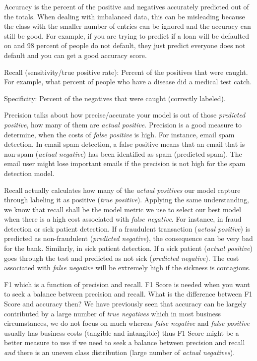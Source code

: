 Accuracy is the percent of the positive and negatives accurately predicted out of the totals.  When dealing with imbalanced data, this can be misleading because the class with the smaller number of entries can be ignored and the accuracy can still be good.  For example, if you are trying to predict if a loan will be defaulted on and 98 percent of people do not default, they just predict everyone does not default and you can get a good accuracy score.

Recall (sensitivity/true positive rate): Percent of the positives that were caught.  For example, what percent of people who have a disease did a medical test catch.

Specificity: Percent of the negatives that were caught (correctly labeled).

Precision talks about how precise/accurate your model is out of those \emph{predicted positive}, how many of them are \emph{actual positive}.
Precision is a good measure to determine, when the costs of \emph{false positive} is high. For instance, email spam detection. In email spam detection, a false positive means that an email that is non-spam (\emph{actual negative}) has been identified as spam (predicted spam). The email user might lose important emails if the precision is not high for the spam detection model.

Recall actually calculates how many of the \emph{actual positives} our model capture through labeling it as positive (\emph{true positive}). Applying the same understanding, we know that recall shall be the model metric we use to select our best model when there is a high cost associated with \emph{false negative}.  For instance, in fraud detection or sick patient detection. If a fraudulent transaction (\emph{actual positive}) is predicted as non-fraudulent (\emph{predicted negative}), the consequence can be very bad for the bank.  Similarly, in sick patient detection. If a sick patient (\emph{actual positive}) goes through the test and predicted as not sick (\emph{predicted negative}). The cost associated with \emph{false negative} will be extremely high if the sickness is contagious.

F1 which is a function of precision and recall.  F1 Score is needed when you want to seek a balance between precision and recall. What is the difference between F1 Score and accuracy then?  We have previously seen that accuracy can be largely contributed by a large number of \emph{true negatives} which in most business circumstances, we do not focus on much whereas \emph{false negative} and \emph{false positive} usually has business costs (tangible and intangible) thus F1 Score might be a better measure to use if we need to seek a balance between precision and recall \emph{and} there is an uneven class distribution (large number of \emph{actual negatives}).


